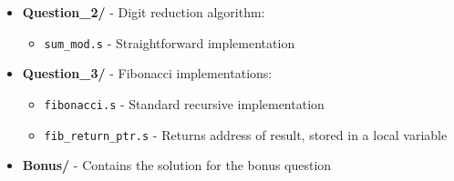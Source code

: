 \documentclass[a4paper,12pt]{article}
\newenvironment{sectionbox}[1]{%
    \tcolorbox[
        colback=titleblue!5,
        colframe=titleblue!50,
        arc=3mm,
        title=#1,
        fonttitle=\bfseries\sffamily,
        before skip=1.2em,
        after skip=1.2em
    ]
}{\endtcolorbox}
\begin{document}
\begin{sectionbox}{Project Structure}
\begin{itemize}[leftmargin=2em, itemsep=0.5em]
    \item \textbf{Question\_2/} - Digit reduction algorithm:
    \begin{itemize}
        \item \texttt{sum\_mod.s} - Straightforward implementation
    \end{itemize}

    \item \textbf{Question\_3/} - Fibonacci implementations:
    \begin{itemize}
        \item \texttt{fibonacci.s} - Standard recursive implementation
        \item \texttt{fib\_return\_ptr.s} - Returns address of result, stored in a local variable
    \end{itemize}

    \item \textbf{Bonus/} - Contains the solution for the bonus question
\end{itemize}
\end{sectionbox}
\end{document}
